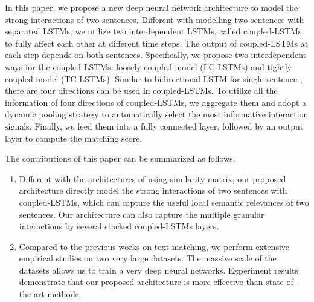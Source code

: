 \documentclass{article}
\begin{document}




 In this paper, we propose a new deep neural network architecture to model the strong interactions of two sentences.
 Different with modelling two sentences with separated LSTMs, we utilize two interdependent LSTMs, called coupled-LSTMs, to fully affect each other at different time steps. The output of coupled-LSTMs at each step depends on both sentences. Specifically, we propose two interdependent ways for the coupled-LSTMs: loosely coupled model (LC-LSTMs) and tightly coupled model (TC-LSTMs). Similar to bidirectional LSTM for single sentence \cite{schuster1997bidirectional,graves2005framewise}, there are four directions can be used in coupled-LSTMs. To utilize all the information of four directions of coupled-LSTMs, we aggregate them and adopt a dynamic pooling strategy to automatically select the most informative interaction signals. Finally, we feed them into a fully connected layer, followed by an output layer to compute the matching score.

 The contributions of this paper can be summarized as follows.
 \begin{enumerate}
   \item Different with the architectures of using similarity matrix, our proposed architecture directly model the strong interactions of two sentences with coupled-LSTMs, which can capture the useful local semantic relevances of two sentences. Our architecture can also capture the multiple granular interactions by several stacked coupled-LSTMs layers.
   \item Compared to the previous works on text matching, we perform extensive empirical studies on two very large datasets. The massive scale of the datasets allows us to train a very deep neural networks. Experiment results demonstrate that our proposed architecture is more effective than state-of-the-art methods.
 \end{enumerate}
\end{document}

